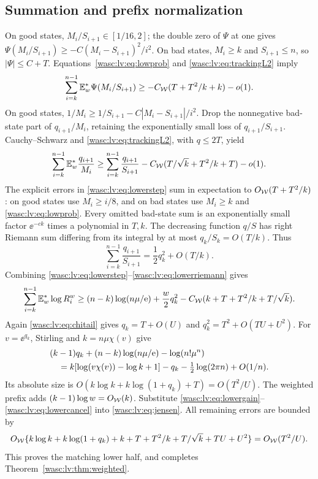 \documentclass[11pt,a4paper]{article}
\theoremstyle{remark}\newtheorem{remark}[theorem]{Remark}
\numberwithin{equation}{section}
\begin{document}
\subsection{Summation and prefix normalization}
On good states, $M_i/S_{i+1}\in[1/16,2]$; the double zero of $\Psi$ at one gives
$\Psi(M_i/S_{i+1})\ge-C(M_i-S_{i+1})^2/i^2$.
On bad states, $M_i\ge k$ and $S_{i+1}\le n$, so $|\Psi|\le C+T$.
Equations~\eqref{wasc:lv:eq:lowprob} and \eqref{wasc:lv:eq:trackingL2} imply
\begin{equation}\label{wasc:lv:eq:psisum}
\sum_{i=k}^{n-1}\mathbb E_w^*\Psi(M_i/S_{i+1})
\ge-C_{\mathcal W}(T+T^2/k+k)-o(1).
\end{equation}
On good states,
$1/M_i\ge1/S_{i+1}-C|M_i-S_{i+1}|/i^2$.
Drop the nonnegative bad-state part of $q_{i+1}/M_i$, retaining the exponentially small loss of $q_{i+1}/S_{i+1}$. Cauchy--Schwarz and \eqref{wasc:lv:eq:trackingL2}, with $q\le2T$, yield
\begin{equation}\label{wasc:lv:eq:qrecipsum}
\sum_{i=k}^{n-1}\mathbb E_w^*\frac{q_{i+1}}{M_i}
\ge\sum_{i=k}^{n-1}\frac{q_{i+1}}{S_{i+1}}
-C_{\mathcal W}(T/\sqrt{k}+T^2/k+T)-o(1).
\end{equation}
The explicit errors in \eqref{wasc:lv:eq:lowerstep} sum in expectation to
$O_{\mathcal W}(T+T^2/k)$: on good states use $M_i\ge i/8$, and on bad states use $M_i\ge k$ and \eqref{wasc:lv:eq:lowprob}. Every omitted bad-state sum is an exponentially small factor $\ee^{-ck}$ times a polynomial in $T,k$.
The decreasing function $q/S$ has right Riemann sum differing from its integral by at most $q_k/S_k=O(T/k)$. Thus
\begin{equation}\label{wasc:lv:eq:lowerriemann}
\sum_{i=k}^{n-1}\frac{q_{i+1}}{S_{i+1}}=\frac12q_k^2+O(T/k).
\end{equation}
Combining \eqref{wasc:lv:eq:lowerstep}--\eqref{wasc:lv:eq:lowerriemann} gives
\begin{equation}\label{wasc:lv:eq:lowergain}
\sum_{i=k}^{n-1}\mathbb E_w^*\log R_i^w
\ge(n-k)\log(n\mu/\mathrm e)+\frac w2q_k^2
-C_{\mathcal W}(k+T+T^2/k+T/\sqrt{k}).
\end{equation}
Again \eqref{wasc:lv:eq:chitail} gives $q_k=T+O(U)$ and $q_k^2=T^2+O(TU+U^2)$.
For $v=\ee^{q_k}$, Stirling and $k=n\mu\chi(v)$ give
\begin{align}\label{wasc:lv:eq:lowercancel}
&(k-1)q_k+(n-k)\log(n\mu/\mathrm e)-\log(n!\mu^n)\notag\\
&\quad=k[\log(v\chi(v))-\log k+1]-q_k
-\tfrac12\log(2\pi n)+O(1/n).
\end{align}
Its absolute size is
$O(k\log k+k\log(1+q_k)+T)=O(T^2/U)$.
The weighted prefix adds $(k-1)\log w=O_{\mathcal W}(k)$.
Substitute \eqref{wasc:lv:eq:lowergain}--\eqref{wasc:lv:eq:lowercancel} into \eqref{wasc:lv:eq:jensen}.
All remaining errors are bounded by
\[
O_{\mathcal W}\{k\log k+k\log(1+q_k)+k+T+T^2/k+T/\sqrt{k}+TU+U^2\}
=O_{\mathcal W}(T^2/U).
\]
This proves the matching lower half, and completes Theorem~\ref{wasc:lv:thm:weighted}.
\end{document}
